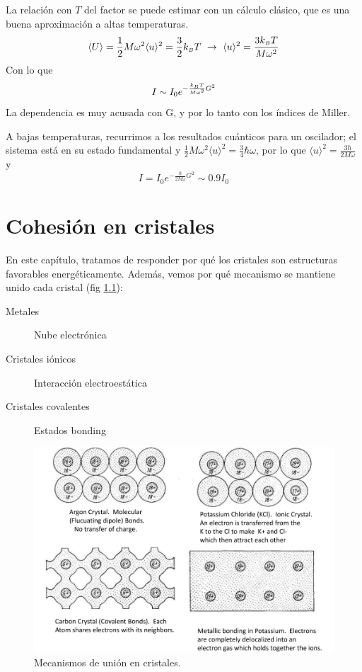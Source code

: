 La relación con $T$ del factor se puede estimar con un cálculo
clásico, que es una buena aproximación a altas temperaturas.
\begin{equation}
  \langle U \rangle = \frac{1}{2} M \omega^2 \langle u \rangle ^2 = \frac{3}{2}k_{\scriptscriptstyle{B}}  T \ \rightarrow \ \langle u \rangle ^2 = \frac{3k_{\scriptscriptstyle{B}}  T}{M\omega^2}
\end{equation}
Con lo que 
\begin{equation}
  I \sim I_0 e^{-\frac{k_{\scriptscriptstyle{B}} T}{M\omega^2}G^2}
\end{equation}
La dependencia es muy acusada con G, y por lo tanto con los índices de
Miller.

A bajas temperaturas, recurrimos a los resultados cuánticos para un
oscilador; el sistema está en su estado fundamental y
$\frac{1}{2}M\omega^2 \langle u \rangle ^2 = \frac{3}{4}\hbar \omega$,
por lo que $\langle u \rangle ^2 = \frac{3\hbar}{2M\omega}$ y 
\begin{equation}
  I = I_0 e^{-\frac{\hbar}{2M\omega}G^2} \sim 0.9 I_0
\end{equation}


\chapter{Cohesión en cristales}
En este capítulo, tratamos de responder por qué los cristales son
estructuras favorables energéticamente. Además, vemos por qué
mecanismo se mantiene unido cada cristal (fig \ref{fig:cristalbondings}):
\begin{description}
\item[Metales] Nube electrónica
\item[Cristales iónicos] Interacción electroestática
\item[Cristales covalentes] Estados bonding
\end{description}
\begin{figure}
  \centering
  \includegraphics[width=\textwidth]{figures/cristalbondings.png}
  \caption{Mecanismos de unión en cristales.}
  \label{fig:cristalbondings}
\end{figure}

